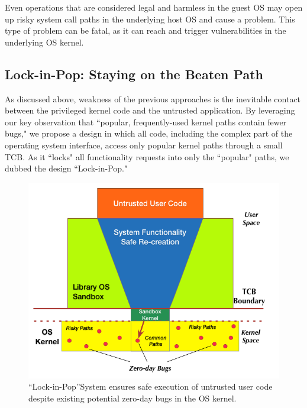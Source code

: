 Even operations that are considered
legal and harmless in the guest OS may open up risky system call paths in the underlying
host OS and cause a problem.
This type of problem can be fatal,
as it can reach and trigger vulnerabilities in the underlying OS kernel.

\subsection{Lock-in-Pop: Staying on the Beaten Path }
As discussed above, weakness of the previous approaches is the inevitable contact
between the privileged kernel code and the untrusted application.
By leveraging our key observation
that ``popular, frequently-used kernel paths contain fewer bugs," we propose a design
in which all code, including the complex part
of the operating system interface, access only
popular kernel paths through a small TCB. As it ``locks" all functionality
requests into only the ``popular" paths, we dubbed the
design ``Lock-in-Pop."

\begin{figure}%
\centering
\includegraphics[width=.9\columnwidth]{diagram/Virtualization_Design_Model_01.png}
\caption{\small ``Lock-in-Pop''System ensures safe execution of untrusted user code
despite existing potential zero-day bugs in the OS kernel.}
\label{fig:design_safe_reimplementation}
\end{figure}

